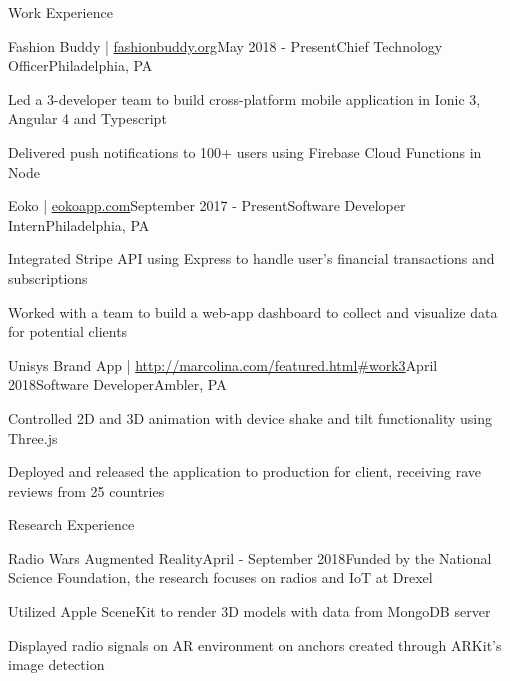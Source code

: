 \documentclass{resume} %
\begin{document}
\begin{rSection}{Work Experience}
\begin{rSubsection}{Fashion Buddy | \url{fashionbuddy.org}}{May 2018 - Present}{Chief Technology Officer}{Philadelphia, PA}
\item Led a 3-developer team to build cross-platform mobile application in Ionic 3, Angular 4 and Typescript
\item Delivered push notifications to 100+ users using Firebase Cloud Functions in Node

\end{rSubsection}
\begin{rSubsection}{Eoko | \url{eokoapp.com}}{September 2017 - Present}{Software Developer Intern}{Philadelphia, PA}
\item Integrated Stripe API using Express to handle user's financial transactions and subscriptions 
\item Worked with a team to build a web-app dashboard to collect and visualize data for potential clients

\end{rSubsection}

\begin{rSubsection}{Unisys Brand App | \url{http://marcolina.com/featured.html#work3}}{April 2018}{Software Developer}{Ambler, PA}
\item Controlled 2D and 3D animation with device shake and tilt functionality using Three.js
\item Deployed and released the application to production for client, receiving rave reviews from 25 countries
\end{rSubsection}


\end{rSection}



\begin{rSection}{Research Experience}
\begin{rSubsection}{Radio Wars Augmented Reality}{April - September 2018}{Funded by the National Science Foundation, the research focuses on radios and IoT at Drexel}{}
\item Utilized Apple SceneKit to render 3D models with data from MongoDB server
\item Displayed radio signals on AR environment on anchors created through ARKit's image detection
\end{rSubsection}


\end{rSection}
\end{document}

